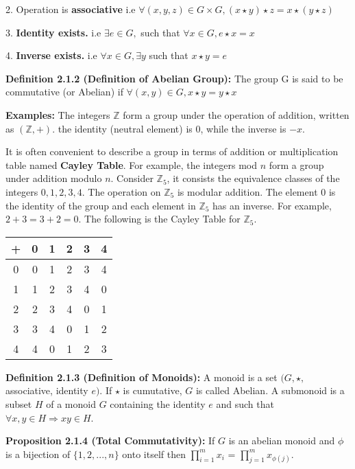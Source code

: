\documentclass[12pt,openany]{book}
\theoremstyle{definition}
\theoremstyle{definition}
\begin{document}
2. Operation is \textbf{associative} i.e $\forall (x, y, z) \in G \times G, (x \star y) \star z = x \star (y \star z) $

3. \textbf{Identity exists.} i.e $\exists e \in G,$ such that $\forall x \in G, e \star x = x $

4. \textbf{Inverse exists.} i.e $\forall x \in G, \exists y$ such that $x \star y = e$

\noindent\textbf{Definition 2.1.2 (Definition of Abelian Group):} The group G is said to be commutative (or Abelian) if $\forall (x,y) \in G, x \star y = y \star x$

\noindent\textbf{Examples:} The integers $\mathbb{Z}$ form a group under the operation of addition, written as $(\mathbb{Z}, +)$. the identity (neutral element) is $0$, while the inverse is $-x$.

\noindent It is often convenient to describe a group in terms of addition or multiplication table named \textbf{Cayley Table}. For example, the integers mod $n$ form a group under addition modulo $n$. Consider $\mathbb{Z}_5$, it consists the equivalence classes of the integers $0,1,2,3,4$. The operation on $\mathbb{Z}_5$ is modular addition. The element $0$ is the identity of the group and each element in $\mathbb{Z}_5$ has an inverse. For example, $2+3 = 3+2 = 0$. The following is the Cayley Table for $\mathbb{Z}_5$.

\begin{center}
\begin{tabular}{ |c|c|c|c|c|c| } 
\hline
+ & 0 & 1 & 2 & 3 & 4 \\
\hline
0 & 0 & 1 & 2 & 3 & 4 \\ 
1 & 1 & 2 & 3 & 4 & 0 \\ 
2 & 2 & 3 & 4 & 0 & 1 \\ 
3 & 3 & 4 & 0 & 1 & 2 \\ 
4 & 4 & 0 & 1 & 2 & 3 \\
\hline
\end{tabular}
\end{center}

\noindent\textbf{Definition 2.1.3 (Definition of Monoids):} A monoid is a set $(G, \star,$ associative, identity $e)$. If $\star$ is cumutative, $G$ is called Abelian. A submonoid is a subset $H$ of a monoid $G$ containing the identity $e$ and such that $\forall x, y \in H \Rightarrow xy \in H $.

\noindent\textbf{Proposition 2.1.4 (Total Commutativity):} If $G$ is an abelian monoid and $\phi$ is a bijection of $\{1,2,...,n\}$ onto itself then $\prod^{m}_{i=1}x_i$ = $\prod^{m}_{j=1}x_{\phi(j)}$.
\end{document}
